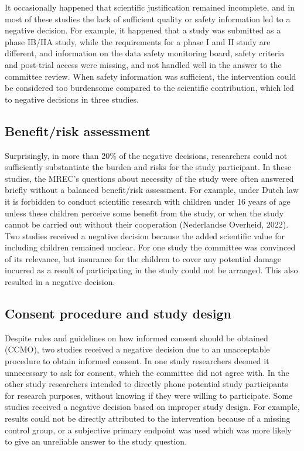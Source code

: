 \documentclass[authordate, meta, issue]{jote-new-article}
\begin{document}
It occasionally happened that scientific justification remained incomplete, and in most of these studies the lack of sufficient quality or safety information led to a negative decision. For example, it happened that a study was submitted as a phase IB/IIA study, while the requirements for a phase I and II study are different, and information on the data safety monitoring board, safety criteria and post-trial access were missing, and not handled well in the answer to the committee review. When safety information was sufficient, the intervention could be considered too burdensome compared to the scientific contribution, which led to negative decisions in three studies.







\subsection{Benefit/risk assessment}



Surprisingly, in more than 20\% of the negative decisions, researchers could not sufficiently substantiate the burden and risks for the study participant. In these studies, the MREC's questions about necessity of the study were often answered briefly without a balanced benefit/risk assessment. For example, under Dutch law it is forbidden to conduct scientific research with children under 16 years of age unless these children perceive some benefit from the study, or when the study cannot be carried out without their cooperation (Nederlandse Overheid, 2022). Two studies received a negative decision because the added scientific value for including children remained unclear. For one study the committee was convinced of its relevance, but insurance for the children to cover any potential damage incurred as a result of participating in the study could not be arranged. This also resulted in a negative decision.







\subsection{Consent procedure and study design}



Despite rules and guidelines on how informed consent should be obtained (CCMO), two studies received a negative decision due to an unacceptable procedure to obtain informed consent. In one study researchers deemed it unnecessary to ask for consent, which the committee did not agree with. In the other study researchers intended to directly phone potential study participants for research purposes, without knowing if they were willing to participate. Some studies received a negative decision based on improper study design. For example, results could not be directly attributed to the intervention because of a missing control group, or a subjective primary endpoint was used which was more likely to give an unreliable answer to the study question.
\end{document}
